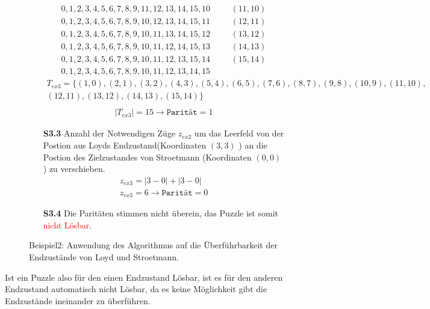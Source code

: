 \begin{figure}[H]
\begin{enumerate}
\begin{align*}
		0,1,2,3,4,5,6,7,8,9,11,12,13,14,15,10 &\hspace{20pt} (11,10)\\
		0,1,2,3,4,5,6,7,8,9,10,12,13,14,15,11 &\hspace{20pt} (12,11)\\
		0,1,2,3,4,5,6,7,8,9,10,11,13,14,15,12 &\hspace{20pt} (13,12)\\
		0,1,2,3,4,5,6,7,8,9,10,11,12,14,15,13 &\hspace{20pt} (14,13)\\
		0,1,2,3,4,5,6,7,8,9,10,11,12,13,15,14 &\hspace{20pt} (15,14)\\
		0,1,2,3,4,5,6,7,8,9,10,11,12,13,14,15
		\end{align*}
		\begin{align*}
		T_{ex3} = \{(1,0),(2,1),(3,2),(4,3),(5,4),(6,5),(7,6),(8,7),(9,8),(10,9),(11,10),\\(12,11),(13,12),(14,13),(15,14)\}\\
		\end{align*}
		\begin{align*}
		\left\vert T_{ex3}\right\vert = 15 \rightarrow \texttt{Parität} = 1	
		\end{align*}
		\item[\textbf{S3.3}] Anzahl der Notwendigen Züge $z_{ex2}$ um das Leerfeld von der Postion aus Loyds Endzustand(Koordinaten $(3,3)$ ) an die Postion des Zielzustandes von Stroetmann (Koordinaten $(0,0)$) zu verschieben.
		\begin{align*}		
		z_{ex3} = \left | 3 - 0 \right | + \left | 3 - 0 \right |\\
		z_{ex3} = 6 \rightarrow \texttt{Parität} = 0
		\end{align*}	
		\item[\textbf{S3.4}] Die Paritäten stimmen nicht überein, das Puzzle ist somit \textcolor{red}{nicht Lösbar}.	
	\end{enumerate}
	\caption{Beispiel2: Anwendung des Algorithmus auf die Überführbarkeit der Endzustände von Loyd und Stroetmann. \label{fig:Ex3_algo}}
\end{figure}
Ist ein Puzzle also für den einen Endzustand Lösbar, ist es für den anderen Endzustand automatisch nicht Lösbar, da es keine Möglichkeit gibt die Endzustände ineinander zu überführen.

